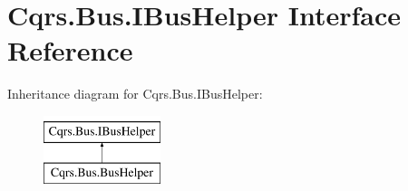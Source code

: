 \hypertarget{interfaceCqrs_1_1Bus_1_1IBusHelper}{}\section{Cqrs.\+Bus.\+I\+Bus\+Helper Interface Reference}
\label{interfaceCqrs_1_1Bus_1_1IBusHelper}
Inheritance diagram for Cqrs.\+Bus.\+I\+Bus\+Helper\+:\begin{figure}[H]
\begin{center}
\leavevmode
\includegraphics[height=2.000000cm]{interfaceCqrs_1_1Bus_1_1IBusHelper}
\end{center}
\end{figure}
